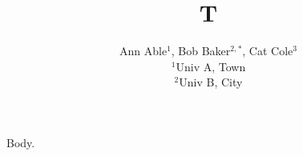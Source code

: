 \documentclass{article}
\author{Ann Able$^{1}$, Bob Baker$^{2,*}$, Cat Cole$^{3}$\\ $^{1}$Univ A, Town\\ $^{2}$Univ B, City}
\title{T}
\begin{document}
\maketitle
Body.
\end{document}
